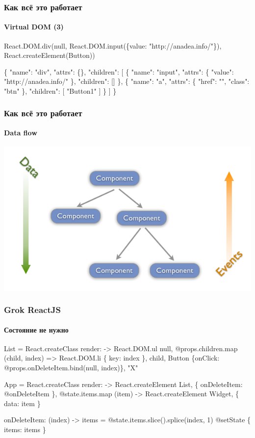 \documentclass[10pt,utf8]{beamer}
\begin{document}
\begin{frame}[fragile]
  \frametitle{Как всё это работает}
  \framesubtitle{Virtual DOM (3)}

  \fontsize{9pt}{9.2}\selectfont

  \begin{semiverbatim}
    React.DOM.div(null,
      React.DOM.input(\{value: "http://anadea.info/"\}),
      React.createElement(Button))
  \end{semiverbatim}

  \begin{semiverbatim}
    \{
      "name": "div"\phantom{},
      "attrs": \{\},
      "children": [
        \{
          "name": "input"\phantom{},
          "attrs": \{ "value": "http://anadea.info/" \},
          "children": []
        \},
        \{
          "name": "a"\phantom{},
          "attrs": \{ "href": "\phantom{}"\phantom{}, "class": "btn" \},
          "children": [ "Button1" ]
        \}
      ]
    \}
  \end{semiverbatim}
\end{frame}

\begin{frame}[fragile]
  \frametitle{Как всё это работает}
  \framesubtitle{Data flow}

  \includegraphics[scale=0.5]{data-event-flow.png}
\end{frame}

\begin{frame}[fragile]
  \frametitle{Grok ReactJS}
  \framesubtitle{Состояние не нужно}

  \fontsize{9pt}{9.2}\selectfont

  \begin{semiverbatim}
List = React.createClass
  render: ->
    React.DOM.ul null,
      \alert{@props.children}.map (child, index) =>
        React.DOM.li \{ key: index \},
          \alert{child},
          Button \{onClick: \alert{@props.onDeleteItem}.bind(null, index)\}, "X"


App = React.createClass
  render: ->
    React.createElement List, \{ onDeleteItem: @onDeleteItem \},
      @state.items.map (item) ->
        React.createElement \alert{Widget}, \{ data: item \}

  onDeleteItem: (index) ->
    items = @state.items.slice().splice(index, 1)
    @setState \{ items: items \}
  \end{semiverbatim}
\end{frame}
\end{document}

